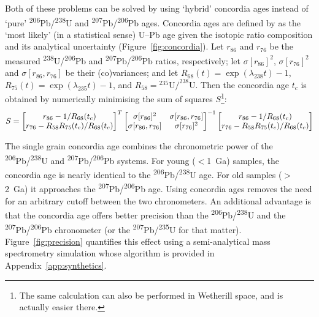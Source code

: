 \documentclass[gchron, manuscript]{copernicus}
\begin{document}
Both of these problems can be solved by using `hybrid' concordia ages
instead of `pure' \textsuperscript{206}Pb/\textsuperscript{238}U and
\textsuperscript{207}Pb/\textsuperscript{206}Pb ages. Concordia ages
are defined by \citet{ludwig1998} as the `most likely' (in a
statistical sense) U--Pb age given the isotopic ratio composition and
its analytical uncertainty (Figure~\ref{fig:concordia}).  Let $r_{86}$
and $r_{76}$ be the measured
\textsuperscript{238}U/\textsuperscript{206}Pb and
\textsuperscript{207}Pb/\textsuperscript{206}Pb ratios, respectively;
let $\sigma[r_{86}]^2$, $\sigma[r_{76}]^2$ and $\sigma[r_{86},r_{76}]$
be their (co)variances; and let $R_{68}(t) = \exp(\lambda_{238}t) -
1$, $R_{75}(t) = \exp(\lambda_{235}t) - 1$, and $R_{58} =
{}^{235}\mbox{U/}^{238}\mbox{U}$.  Then the concordia age $t_c$ is
obtained by numerically minimising the sum of squares $S$\footnote{The
  same calculation can also be performed in Wetherill space, and is
  actually easier there.}:
\begin{equation}
  S = \left[
    \begin{array}{@{}c@{}}
      r_{86} - 1/R_{68}(t_c) \\
      r_{76} - R_{58} R_{75}(t_c)/R_{68}(t_c)
    \end{array}
    \right]^T\left[
    \begin{array}{@{}cc@{}}
      \sigma[r_{86}]^2 & \sigma[r_{86},r_{76}] \\
      \sigma[r_{86},r_{76}] & \sigma[r_{76}]^2
    \end{array}
    \right]^{-1}
  \left[
    \begin{array}{@{}c@{}}
      r_{86} - 1/R_{68}(t_c) \\
      r_{76} - R_{58} R_{75}(t_c)/R_{68}(t_c)
    \end{array}
    \right]
  \label{eq:S}
\end{equation}

The single grain concordia age combines the chronometric power of the
\textsuperscript{206}Pb/\textsuperscript{238}U and
\textsuperscript{207}Pb/\textsuperscript{206}Pb systems. For young
($<$1~Ga) samples, the concordia age is nearly identical to the
\textsuperscript{206}Pb/\textsuperscript{238}U age. For old samples
($>$2~Ga) it approaches the
\textsuperscript{207}Pb/\textsuperscript{206}Pb age. Using concordia
ages removes the need for an arbitrary cutoff between the two
chronometers. An additional advantage is that the concordia age offers
better precision than the
\textsuperscript{206}Pb/\textsuperscript{238}U and the
\textsuperscript{207}Pb/\textsuperscript{206}Pb chronometer (or the
\textsuperscript{207}Pb/\textsuperscript{235}U for that matter).
Figure~\ref{fig:precision} quantifies this effect using a
semi-analytical mass spectrometry simulation whose algorithm is
provided in Appendix~\ref{app:synthetics}.
\end{document}
